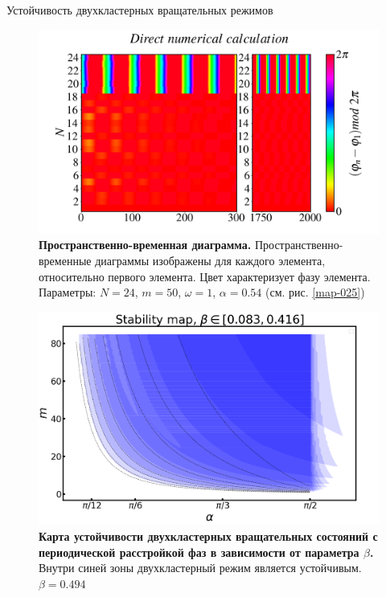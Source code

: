 \begin{chapter}{Устойчивость двухкластерных вращательных режимов}
	\begin{figure}[h!]
		\begin{center}
			\includegraphics[width=1\columnwidth]{pictures/Figure_M_50_A_0.54_O_1.png}
		\end{center}
		\caption{\textbf{Пространственно-временная диаграмма.}
		Пространственно-временные диаграммы изображены для каждого элемента, относительно первого элемента.
		Цвет характеризует фазу элемента. Параметры: $N=24$, $m = 50$, $\omega = 1$, $\alpha = 0.54$ (см. рис. \ref{map-025})}
	\end{figure}

	\begin{figure}[h!]
		\begin{center}
			\includegraphics[width=1\columnwidth]{pictures/st-map.png}
		\end{center}
		\caption{\textbf{Карта устойчивости двухкластерных вращательных состояний с периодической расстройкой фаз в зависимости от параметра $\beta$.}
		Внутри синей зоны двухкластерный режим является устойчивым.
		$\beta = 0.494$}
	\end{figure}

\end{chapter}
